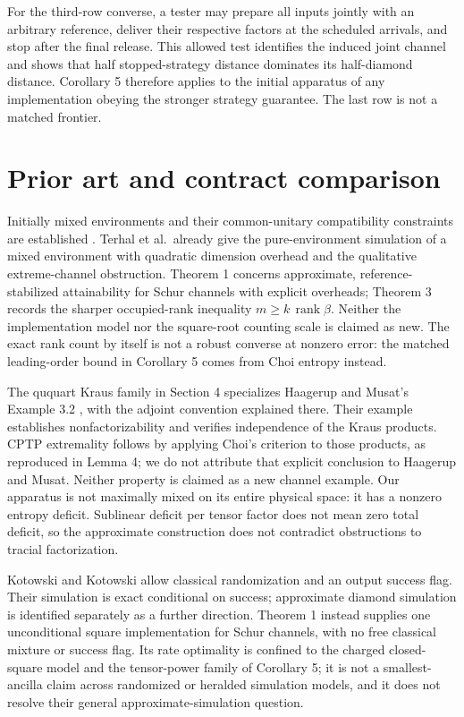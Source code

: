 \documentclass[11pt,a4paper]{article}
\numberwithin{equation}{section}
\begin{document}
For the third-row converse, a tester may prepare all inputs jointly with
an arbitrary reference, deliver their respective factors at the
scheduled arrivals, and stop after the final release. This allowed test
identifies the induced joint channel and shows that half
stopped-strategy distance dominates its half-diamond distance. Corollary
5 therefore applies to the initial apparatus of any implementation
obeying the stronger strategy guarantee. The last row is not a matched
frontier.

\section{Prior art and contract
comparison}\label{prior-art-and-contract-comparison}

Initially mixed environments and their common-unitary compatibility
constraints are established \citep{terhal1999, zalka2002}. Terhal et
al.~already give the pure-environment simulation of a mixed environment
with quadratic dimension overhead and the qualitative extreme-channel
obstruction. Theorem 1 concerns approximate, reference-stabilized
attainability for Schur channels with explicit overheads; Theorem 3
records the sharper occupied-rank inequality
\(m\ge k\,\operatorname{rank}\beta\). Neither the implementation model
nor the square-root counting scale is claimed as new. The exact rank
count by itself is not a robust converse at nonzero error: the matched
leading-order bound in Corollary 5 comes from Choi entropy instead.

The ququart Kraus family in Section 4 specializes Haagerup and Musat's
Example 3.2 \citep{haagerup2011}, with the adjoint convention explained
there. Their example establishes nonfactorizability and verifies
independence of the Kraus products. CPTP extremality follows by applying
Choi's criterion to those products, as reproduced in Lemma 4; we do not
attribute that explicit conclusion to Haagerup and Musat. Neither
property is claimed as a new channel example. Our apparatus is not
maximally mixed on its entire physical space: it has a nonzero entropy
deficit. Sublinear deficit per tensor factor does not mean zero total
deficit, so the approximate construction does not contradict
obstructions to tracial factorization.

Kotowski and Kotowski \citep[Definition 2.3]{kotowski2026} allow
classical randomization and an output success flag. Their simulation is
exact conditional on success; approximate diamond simulation is
identified separately as a further direction. Theorem 1 instead supplies
one unconditional square implementation for Schur channels, with no free
classical mixture or success flag. Its rate optimality is confined to
the charged closed-square model and the tensor-power family of Corollary
5; it is not a smallest-ancilla claim across randomized or heralded
simulation models, and it does not resolve their general
approximate-simulation question.
\end{document}
